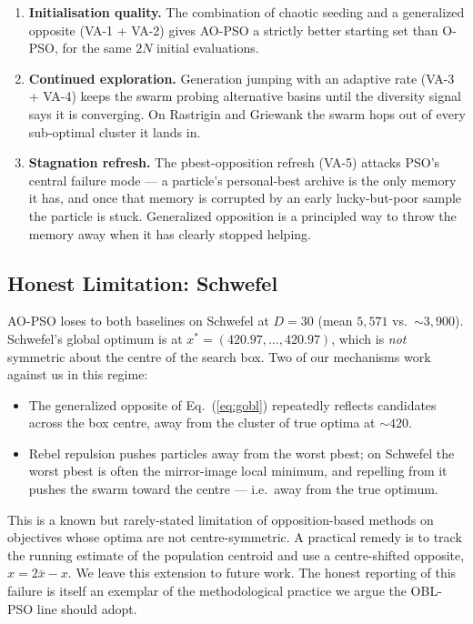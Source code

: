 \documentclass[11pt,a4paper]{article}
\newcommand{\algoname}{AO-PSO}
\newcommand{\opso}{O-PSO}
\begin{document}
\begin{enumerate}
  \item \textbf{Initialisation quality.} The combination of chaotic seeding
        and a generalized opposite (VA-1 + VA-2) gives \algoname{} a strictly
        better starting set than \opso{}, for the same $2N$ initial
        evaluations.
  \item \textbf{Continued exploration.} Generation jumping with an adaptive
        rate (VA-3 + VA-4) keeps the swarm probing alternative basins
        until the diversity signal says it is converging. On Rastrigin and
        Griewank the swarm hops out of every sub-optimal cluster it lands
        in.
  \item \textbf{Stagnation refresh.} The pbest-opposition refresh (VA-5)
        attacks PSO's central failure mode --- a particle's personal-best
        archive is the only memory it has, and once that memory is
        corrupted by an early lucky-but-poor sample the particle is stuck.
        Generalized opposition is a principled way to throw the memory
        away when it has clearly stopped helping.
\end{enumerate}

\subsection{Honest Limitation: Schwefel}
\label{sec:discussion-schwefel}

\algoname{} loses to both baselines on Schwefel at $D=30$ (mean $5{,}571$
vs.\ $\sim 3{,}900$). Schwefel's global optimum is at $x^{*} = (420.97,
\ldots, 420.97)$, which is \emph{not} symmetric about the centre of the
search box. Two of our mechanisms work against us in this regime:

\begin{itemize}
  \item The generalized opposite of Eq.~(\ref{eq:gobl}) repeatedly reflects
        candidates across the box centre, away from the cluster of true
        optima at $\sim 420$.
  \item Rebel repulsion pushes particles away from the worst pbest; on
        Schwefel the worst pbest is often the mirror-image local minimum,
        and repelling from it pushes the swarm toward the centre --- i.e.\
        away from the true optimum.
\end{itemize}

This is a known but rarely-stated limitation of opposition-based methods
on objectives whose optima are not centre-symmetric. A practical remedy is
to track the running estimate of the population centroid and use a
centre-shifted opposite, $\hat{x} = 2 \bar{x} - x$. We leave this
extension to future work. The honest reporting of this failure is itself
an exemplar of the methodological practice we argue the OBL-PSO line should
adopt.
\end{document}
